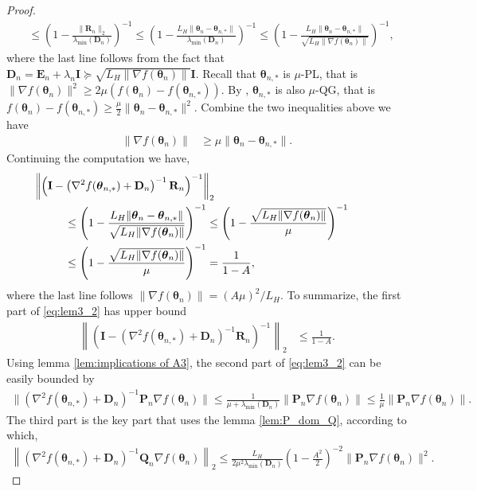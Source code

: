 \documentclass[11pt]{amsart}
\theoremstyle{plain}
\theoremstyle{definition}
\theoremstyle{remark}
\def\D{\mathbf{D}}
\def\bQ{\mathbf{Q}}
\def\bE{\mathbf{E}}
\def\bP{\mathbf{P}}
\def\bR{\mathbf{R}}
\def\param{\boldsymbol{\theta}}
\begin{document}
\begin{proof}
\begin{align*}
      &\leq \left(1-\frac{\|\bR_n\|_{2}}{\lambda_{\min}(\D_n)}\right)^{-1} \leq \left(1-\frac{L_H\|\param_{n}-\param_{n,*}\|}{\lambda_{\min}(\D_n)}\right)^{-1} \leq \left(1-\frac{L_H\|\param_{n}-\param_{n,*}\|}{\sqrt{L_H\|\nabla f(\param_n)\|}}\right)^{-1},
  \end{align*}
  where the last line follows from the fact that $\D_n=\bE_n+\lambda_n\mathbf{I}\succcurlyeq \sqrt{L_H\|\nabla f(\param_n)\|}\mathbf{I}$.
  Recall that $\param_{n,*}$ is $\mu$-PL, that is $\|\nabla f(\param_n)\|^2\geq 2\mu(f(\param_n)-f(\param_{n,*})).$ By \cite{otto2000generalization}, $\param_{n,*}$ is also $\mu$-QG, that is
$f(\param_n)-f(\param_{n,*})\geq \frac{\mu}{2}\|\param_n-\param_{n,*}\|^2. $
Combine the two inequalities above we have
    \begin{align*}
        \|\nabla f(\param_n)\|&\geq \mu\|\param_n-\param_{n,*}\|.
    \end{align*}
Continuing the computation we have,
    \begin{align*}
         &\hspace{-1cm}\left\|\left(\mathbf{I}-\left(\nabla^2f(\param_{n,*})+\D_n\right)^{-1}\bR_n\right)^{-1}\right\|_{2} \\
         &\leq\left(1-\frac{L_H\|\param_n-\param_{n,*}\|}{\sqrt{L_H\|\nabla f(\param_n)\|}}\right)^{-1} \leq \left(1-\frac{\sqrt{L_H\|\nabla f(\param_n)\|}}{\mu}\right)^{-1}\\
          &\leq \left(1-\frac{\sqrt{L_H\|\nabla f(\param_n)\|}}{\mu}\right)^{-1} =\frac{1}{1-A},
    \end{align*}
    where the last line follows $\|\nabla f(\param_n)\|=(A\mu)^2/L_H.$
To summarize, the first part of \eqref{eq:lem3_2} has upper bound
\begin{align}\label{eq:upper_beta_1}
    \left\|\left(\mathbf{I}-\left(\nabla^2f(\param_{n,*})+\D_n\right)^{-1}\bR_n\right)^{-1}\right\|_{2}&\leq \frac{1}{1-A}.
\end{align}
Using lemma \ref{lem:implications of A3}, the second part of \eqref{eq:lem3_2} can be easily bounded by
\begin{align}\label{eq:upper_beta_2}
   \|(\nabla^2f(\param_{n,*})+\D_n)^{-1}\bP_n\nabla f(\param_n)\|\leq \frac{1}{\mu+\lambda_{\min}(\D_n)}\|\bP_n\nabla f(\param_n)\|\leq \frac{1}{\mu}\|\bP_n\nabla f(\param_n)\|.
\end{align}
The third part is the key part that uses the lemma \ref{lem:P_dom_Q}, according to which,
\begin{align*}
\left\|\left(\nabla^2f(\param_{n,*})+\D_n\right)^{-1}\bQ_{n}\nabla f(\param_n)\right\|_{2}\leq \frac{L_H}{2\mu^2\lambda_{\min}(\D_n)}\left(1-\frac{A^2}{2}\right)^{-2}\|\bP_{n}\nabla f(\param_n)\|^2.

\end{align*}
\end{proof}
\end{document}
